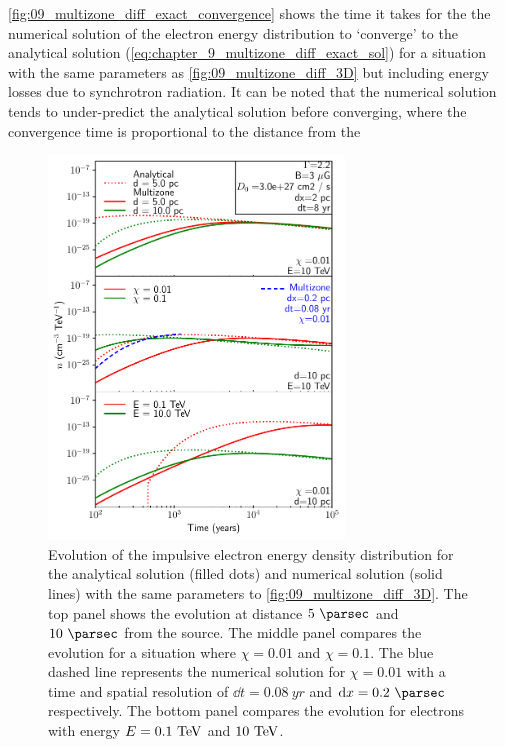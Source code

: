 \autoref{fig:09_multizone_diff_exact_convergence} shows the time it takes for the the numerical solution of the electron energy distribution to `converge' to the analytical solution (\autoref{eq:chapter_9_multizone_diff_exact_sol}) for a situation with the same parameters as \autoref{fig:09_multizone_diff_3D} but including energy losses due to synchrotron radiation. It can be noted that the numerical solution tends to under-predict the analytical solution before converging, where the convergence time is proportional to the distance from the
\begin{figure}[h!]
	\centering
	\includegraphics[width=0.7\textwidth]{09_Multizone/Images/diffusion/analytical_diff_convergence.pdf}
	\caption{Evolution of the impulsive electron energy density distribution for the analytical solution (filled dots) and numerical solution (solid lines) with the same parameters to \autoref{fig:09_multizone_diff_3D}. The top panel shows the evolution at distance $5~\pc$ and $10~\pc$ from the source. The middle panel compares the evolution for a situation where $\chi=0.01$ and $\chi=0.1$. The blue dashed line represents the numerical solution for $\chi=0.01$ with a time and spatial resolution of $\dd{t}=0.08~\si{yr}$ and $\dd{x}=0.2~\pc$ respectively. The bottom panel compares the evolution for electrons with energy $E=0.1~\TeV$ and $10~\TeV$.}
	\label{fig:09_multizone_diff_exact_convergence}
\end{figure} 
